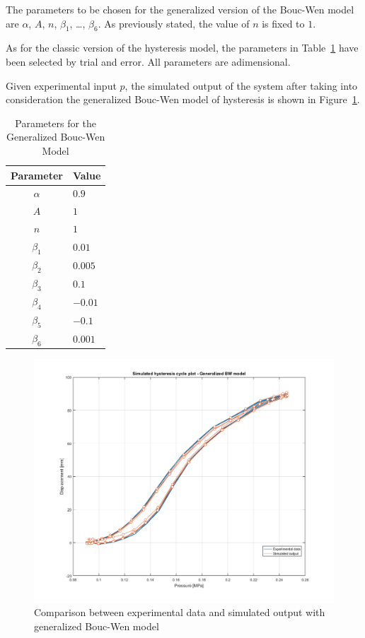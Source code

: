 \begin{minipage}[ht]{0.6\textwidth}
	\vspace*{-2cm}
	The parameters to be chosen for the generalized version of the Bouc-Wen model
	are $\alpha$, $A$, $n$, $\beta_1$, \ldots, $\beta_6$. 
	As previously stated, the value of $n$ is fixed to $1$.
	
	As for the classic version of the hysteresis model, the parameters
	in Table~\ref{tab:gener_param} have been selected by trial and error.
	All parameters are adimensional.
	
	Given experimental input $p$, the simulated output of the system
	after taking into consideration the generalized Bouc-Wen model of hysteresis
	is shown in Figure~\ref{fig:comp_gener}.
\end{minipage}
\hfill
\begin{minipage}{0.35\textwidth}
	\vspace*{-0.5cm}
	\begin{table}[H]
		\centering
		\begin{tabular}{@{}cl@{}}
			\toprule
			\textbf{Parameter} & \textbf{Value} \\ \midrule
			$\alpha$           & $0.9$          \\
			$A$                & $1$          	\\
			$n$   		       & $1$        	\\
			$\beta_1$          & $0.01$       	\\
			$\beta_2$          & $0.005$       	\\
			$\beta_3$          & $0.1$       	\\
			$\beta_4$          & $-0.01$       	\\
			$\beta_5$          & $-0.1$       	\\
			$\beta_6$          & $0.001$       	\\ \bottomrule
		\end{tabular}
		\caption{Parameters for the Generalized Bouc-Wen Model}
		\label{tab:gener_param}
	\end{table}
\end{minipage}

\begin{figure}[H]
	\centering
	\includegraphics[width=\linewidth]{Images/comparison_general}
	\caption{Comparison between experimental data and simulated output with generalized Bouc-Wen model}
	\label{fig:comp_gener}
\end{figure}
